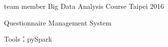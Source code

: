

\begin{cventries}

  \cventry
    {team member} %
    {Big Data Analysis Course} %
    {Taipei} %
    {2016} %
    {
      \begin{cvitems} %
        \item {Questionnaire Management System}
        \item {Tools：pySpark}
      \end{cvitems}
    }

\end{cventries}
